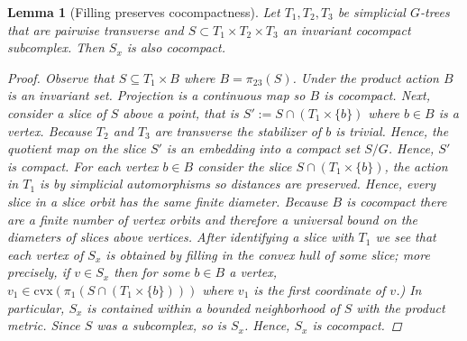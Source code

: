 \documentclass[12pt,parskip=full]{report}
\theoremstyle{plain}
\newtheorem{lem}[thm]{Lemma}
\theoremstyle{definition}
\begin{document}
\begin{lem} 
[Filling preserves cocompactness]
\label{lem:fillingcocompact}
    Let $T_1,T_2,T_3$ be simplicial $G$-trees that are pairwise transverse and $S\subset T_1\times T_2\times T_3$ an invariant cocompact subcomplex. Then $S_x$ is also cocompact.
\begin{proof}
    Observe that $S\subseteq T_1\times B$ where $B=\pi_{23}(S)$. Under the product action $B$ is an invariant set. Projection is a continuous map so $B$ is cocompact. Next, consider a slice of $S$ above a point, that is $S' := S\cap (T_1\times \{b\})$ where $b\in B$ is a vertex. Because $T_2$ and $T_3$ are transverse the stabilizer of $b$ is trivial. Hence, the quotient map on the slice $S'$ is an embedding into a compact set $S/G$. Hence, $S'$ is compact. For each vertex $b\in B$ consider the slice $S\cap (T_1\times \{b\})$, the action in $T_1$ is by simplicial automorphisms so distances are preserved. Hence, every slice in a slice orbit has the same finite diameter. Because $B$ is cocompact there are a finite number of vertex orbits and therefore a universal bound on the diameters of slices above vertices. After identifying a slice with $T_1$ we see that each vertex of $S_x$ is obtained by filling in the convex hull of some slice; more precisely, if $v\in S_x$ then for some $b\in B$ a vertex, $v_1\in \text{cvx}(\pi_1(S\cap(T_1\times \{b\})))$ where $v_1$ is the first coordinate of $v$.) In particular, $S_x$ is contained within a bounded neighborhood of $S$ with the product metric. Since $S$ was a subcomplex, so is $S_x$. Hence, $S_x$ is cocompact.
\end{proof}
\end{lem}
\end{document}
